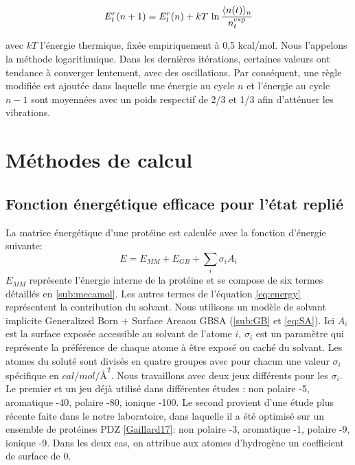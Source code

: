 \begin{itemize}
  \begin{equation} \label{eq:log}
E^r_t (n+1) = E^r_t (n) + kT \, \ln \frac{\langle n(t) \rangle_n}{n_t^{\rm exp}}
\end{equation}

  avec $kT$ l'énergie thermique, fixée empiriquement à 0,5 kcal/mol. Nous l'appelons la méthode logarithmique. Dans les dernières itérations, certaines valeurs ont tendance à converger lentement, avec des oscillations. Par conséquent, une règle modifiée est ajoutée dans laquelle une énergie au cycle $n$ et l'énergie au cycle  $n-1$ sont moyennées avec un poids respectif de 2/3 et 1/3 afin d'atténuer les vibrations.

\end{itemize}

\section{Méthodes de calcul}
  
\subsection{Fonction énergétique efficace pour l'état replié}
\label{phia}
La matrice énergétique d'une protéine est calculée avec la fonction d'énergie suivante:
\begin{equation}
  E = E_{MM} + E_{GB} + \sum_i \sigma_iA_i
  \label{eq:energy} 
\end{equation}
$E_{MM}$ représente l'énergie interne de la protéine et se compose de six termes détaillés en \ref{sub:mecamol}. Les autres termes de l'équation \ref{eq:energy} représentent la contribution du solvant. Nous utilisons un modèle de solvant implicite \og Generalized Born + Surface Area\fg ou GBSA (\ref{sub:GB} et \ref{eq:SA}). Ici $A_i$ est la surface exposée accessible au solvant de l'atome $i$, $\sigma_i$ est un paramètre qui représente la préférence de chaque atome à être exposé ou caché du solvant. Les atomes du soluté sont divisés en quatre groupes avec pour chacun une valeur $\sigma_i$ spécifique en $cal/mol/Å^2$. Nous travaillons avec deux jeux différents pour les $\sigma_i$. Le premier et un jeu déjà utilisé dans différentes études \cite{Mignon16,Druart16b}: non polaire -5, aromatique -40, polaire -80, ionique -100. Le second provient d'une étude plus récente faite dans le notre laboratoire, dans laquelle il a été optimisé sur un ensemble de protéines PDZ \ref{Gaillard17}: non polaire -3, aromatique -1, polaire -9, ionique -9. Dans les deux cas, on attribue aux atomes d'hydrogène un coefficient de surface de 0.

